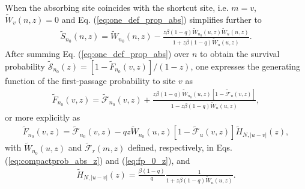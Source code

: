 \documentclass[idelinks, superscriptaddress, amsmath, amssymb, aps, pre]{revtex4-2}
\begin{document}
When the absorbing site coincides with the shortcut site, i.e. $m=v$, $\widetilde{W}_{v}(n,z)=0$ and Eq. (\ref{eq:one_def_prop_abs}) simplifies further to
\begin{align}
\widetilde{S}_{n_0}(n,z)=\widetilde{W}_{n_0}(n,z)-\frac{z\beta (1-q)\widetilde{W}_{n_0}(u,z)\widetilde{W}_{u}(n,z)}{1+z\beta(1-q)\widetilde{W}_{u}(u,z)}.
\label{eq:one_def_prop_abs_2}
\end{align}
After summing Eq. (\ref{eq:one_def_prop_abs}) over $n$ to obtain the survival probability $\widetilde{\mathcal{S}}_{n_0}(z)=\left[1-\widetilde{F}_{n_0}(v,z)\right]/(1-z)$, one expresses the generating function of the first-passage probability to site $v$ as
\begin{align}
\widetilde{F}_{n_0}(v,z)=\widetilde{\mathcal{F}}_{n_0}(v,z)+\frac{z\beta (1-q)\widetilde{W}_{n_0}(u,z)\left[1-\widetilde{\mathcal{F}}_{u}(v,z)\right]}{1-z\beta(1-q)\widetilde{W}_{u}(u,z)},
\label{eq:first_pass_prob}
\end{align}
or more explicitly as
\begin{align}
\widetilde{F}_{n_0}(v,z)=\widetilde{\mathcal{F}}_{n_0}(v,z)-qz\widetilde{W}_{n_0}(u,z)\left[1-\widetilde{\mathcal{F}}_{u}(v,z)\right] \widetilde{H}_{N,|u-v|}(z),
\label{eq:first_pass_prob_2}
\end{align}
with $\widetilde{W}_{n_0}(u,z)$ and $\widetilde{\mathcal{F}}_{r}(m,z)$ defined, respectively, in Eqs. (\ref{eq:compactprob_abs_z}) and (\ref{eq:fp_0_z}), and
 \begin{align}
  \widetilde{H}_{N,|u-v|}(z)=\frac{\beta(1-q)}{q}\frac{1}{1+z\beta(1-q)\widetilde{W}_{u}(u,z)}.
\label{eq:HNuv}
\end{align}
\end{document}
